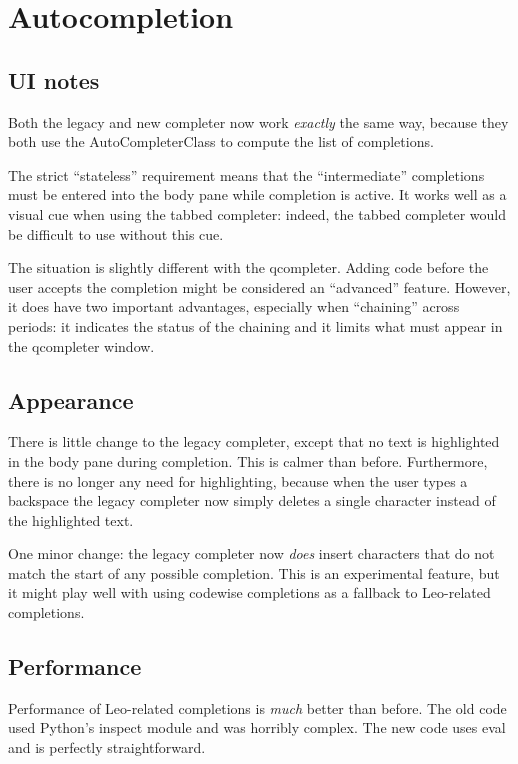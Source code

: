 \documentclass[a4paper,10pt,english]{sphinxmanual}
\begin{document}
\section{Autocompletion}
\label{theory:white-papers}\label{theory:autocompletion}

\subsection{UI notes}
\label{theory:ui-notes}
Both the legacy and new completer now work \emph{exactly} the same way, because
they both use the AutoCompleterClass to compute the list of completions.

The strict ``stateless'' requirement means that the ``intermediate''
completions must be entered into the body pane while completion is active.
It works well as a visual cue when using the tabbed completer: indeed, the
tabbed completer would be difficult to use without this cue.

The situation is slightly different with the qcompleter. Adding code before
the user accepts the completion might be considered an ``advanced'' feature.
However, it does have two important advantages, especially when ``chaining''
across periods: it indicates the status of the chaining and it limits what
must appear in the qcompleter window.


\subsection{Appearance}
\label{theory:appearance}
There is little change to the legacy completer, except that no text is
highlighted in the body pane during completion. This is calmer than before.
Furthermore, there is no longer any need for highlighting, because when the
user types a backspace the legacy completer now simply deletes a single
character instead of the highlighted text.

One minor change: the legacy completer now \emph{does} insert characters that do
not match the start of any possible completion. This is an experimental
feature, but it might play well with using codewise completions as a
fallback to Leo-related completions.


\subsection{Performance}
\label{theory:performance}
Performance of Leo-related completions is \emph{much} better than before. The
old code used Python's inspect module and was horribly complex. The new
code uses eval and is perfectly straightforward.
\end{document}
